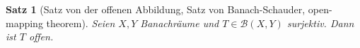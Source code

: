 \documentclass[ngerman]{report}
\theoremstyle{plain}%
\newtheorem{thm}{Satz}[chapter]
\theoremstyle{definition}%
\theoremstyle{myStyle}
\newcommand{\N}{\mathbb{N}}
\newcommand{\BS}[1][X,Y]{\mathcal{B}(#1)} %
\newcommand{\norm}[1]{\left \|#1\right\| }
\newcommand{\df}[1][]{%
	\overset{#1}{\Rightarrow}
}
\newcommand{\TODO}{\text{$\mathbb{TODO}$}}
\begin{document}
	\begin{thm}[Satz von der offenen Abbildung, Satz von Banach-Schauder, open-mapping theorem]
		Seien $X,Y$ Banachräume und $T\in \BS$ surjektiv. Dann ist $T$ offen.	
	\end{thm}
%		
%		 
\end{document}
